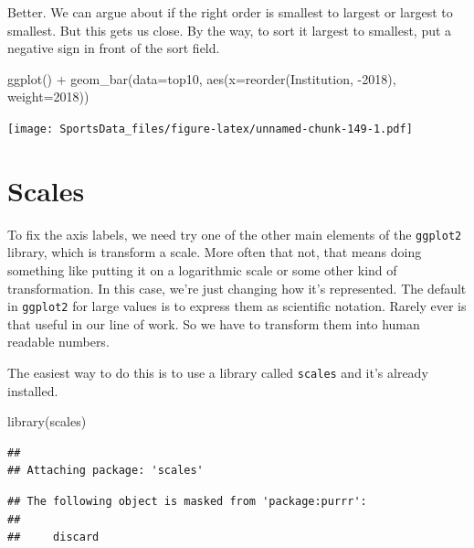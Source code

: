 \documentclass[
]{book}
\newenvironment{Shaded}{\begin{snugshade}}{\end{snugshade}}
\newcommand{\AttributeTok}[1]{\textcolor[rgb]{0.77,0.63,0.00}{#1}}
\newcommand{\FunctionTok}[1]{\textcolor[rgb]{0.00,0.00,0.00}{#1}}
\newcommand{\NormalTok}[1]{#1}
\newcommand{\SpecialCharTok}[1]{\textcolor[rgb]{0.00,0.00,0.00}{#1}}
\newcommand{\StringTok}[1]{\textcolor[rgb]{0.31,0.60,0.02}{#1}}
\begin{document}
Better. We can argue about if the right order is smallest to largest or largest to smallest. But this gets us close. By the way, to sort it largest to smallest, put a negative sign in front of the sort field.

\begin{Shaded}
\begin{Highlighting}[]
\FunctionTok{ggplot}\NormalTok{() }\SpecialCharTok{+} \FunctionTok{geom\_bar}\NormalTok{(}\AttributeTok{data=}\NormalTok{top10, }\FunctionTok{aes}\NormalTok{(}\AttributeTok{x=}\FunctionTok{reorder}\NormalTok{(Institution, }\SpecialCharTok{{-}}\StringTok{\textasciigrave{}}\AttributeTok{2018}\StringTok{\textasciigrave{}}\NormalTok{), }\AttributeTok{weight=}\StringTok{\textasciigrave{}}\AttributeTok{2018}\StringTok{\textasciigrave{}}\NormalTok{))}
\end{Highlighting}
\end{Shaded}

\texttt{[image: SportsData\_files/figure-latex/unnamed-chunk-149-1.pdf]}

\hypertarget{scales}{%
\section{Scales}\label{scales}}

To fix the axis labels, we need try one of the other main elements of the \texttt{ggplot2} library, which is transform a scale. More often that not, that means doing something like putting it on a logarithmic scale or some other kind of transformation. In this case, we're just changing how it's represented. The default in \texttt{ggplot2} for large values is to express them as scientific notation. Rarely ever is that useful in our line of work. So we have to transform them into human readable numbers.

The easiest way to do this is to use a library called \texttt{scales} and it's already installed.

\begin{Shaded}
\begin{Highlighting}[]
\FunctionTok{library}\NormalTok{(scales)}
\end{Highlighting}
\end{Shaded}

\begin{verbatim}
## 
## Attaching package: 'scales'
\end{verbatim}

\begin{verbatim}
## The following object is masked from 'package:purrr':
## 
##     discard
\end{verbatim}
\end{document}
